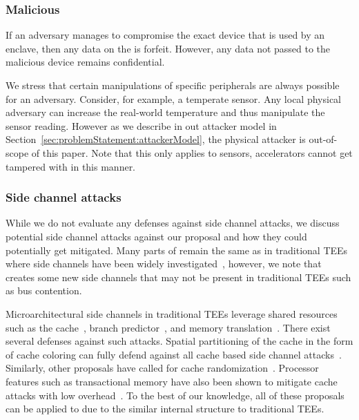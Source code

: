 \subsubsection{Malicious \sphw}
If an adversary manages to compromise the exact device that is used by an enclave, then any data on the \sphw is forfeit. However, any data not passed to the malicious device remains confidential.

We stress that certain manipulations of specific peripherals are always possible for an adversary. Consider, for example, a temperate sensor. Any local physical adversary can increase the real-world temperature and thus manipulate the sensor reading. However as we describe in out attacker model in Section~\ref{sec:problemStatement:attackerModel}, the physical attacker is out-of-scope of this paper. Note that this only applies to sensors, accelerators cannot get tampered with in this manner.

\subsubsection{Side channel attacks}
While we do not evaluate any defenses against side channel attacks, we discuss potential side channel attacks against our proposal and how they could potentially get mitigated. Many parts of \name{} remain the same as in traditional TEEs where side channels have been widely investigated~\cite{brasser2017software,brasser2019dr,gruss2017strongsidechannel}, however, we note that \name{} creates some new side channels that may not be present in traditional TEEs such as bus contention. 

\setcounter{para}{0}
Microarchitectural side channels in traditional TEEs leverage shared resources such as the cache~\cite{brasser2017software}, branch predictor~\cite{lee2017inferring}, and memory translation~\cite{xu2015controlled}. There exist several defenses against such attacks. Spatial partitioning of the cache in the form of cache coloring can fully defend against all cache based side channel attacks~\cite{costan2016sanctum,zhang2009cachecoloring,zhaosonicboom}. Similarly, other proposals have called for cache randomization~\cite{brasser2019dr,werner2019scattercache}. Processor features such as transactional memory have also been shown to mitigate cache attacks with low overhead~\cite{gruss2017strongsidechannel}. To the best of our knowledge, all of these proposals can be applied to \name{} due to the similar internal structure to traditional TEEs.

